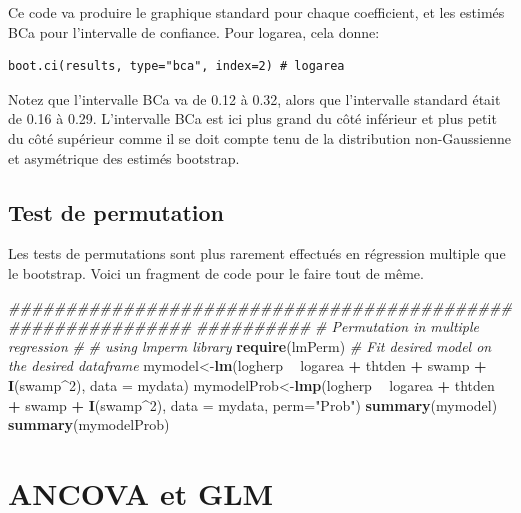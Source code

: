 \documentclass[12pt,]{book}
\newenvironment{Shaded}{\begin{snugshade}}{\end{snugshade}}
\newcommand{\CommentTok}[1]{\textcolor[rgb]{0.37,0.37,0.37}{\textit{#1}}}
\newcommand{\DataTypeTok}[1]{\textcolor[rgb]{0.27,0.27,0.27}{#1}}
\newcommand{\DecValTok}[1]{\textcolor[rgb]{0.06,0.06,0.06}{#1}}
\newcommand{\KeywordTok}[1]{\textcolor[rgb]{0.27,0.27,0.27}{\textbf{#1}}}
\newcommand{\NormalTok}[1]{#1}
\newcommand{\OperatorTok}[1]{\textcolor[rgb]{0.43,0.43,0.43}{\textbf{#1}}}
\newcommand{\StringTok}[1]{\textcolor[rgb]{0.5,0.5,0.5}{#1}}
\begin{document}
Ce code va produire le graphique standard pour chaque coefficient, et les estimés BCa pour l'intervalle de confiance. Pour logarea, cela donne:

\begin{verbatim}
boot.ci(results, type="bca", index=2) # logarea
\end{verbatim}

Notez que l'intervalle BCa va de 0.12 à 0.32, alors que l'intervalle standard était de 0.16 à 0.29. L'intervalle BCa est ici plus grand du côté inférieur et plus petit du côté supérieur comme il se doit compte tenu de la distribution non-Gaussienne et asymétrique des estimés bootstrap.

\hypertarget{perm_reg_mult}{%
\section{Test de permutation}\label{perm_reg_mult}}

Les tests de permutations sont plus rarement effectués en régression multiple que le bootstrap. Voici un fragment de code pour le faire tout de même.

\begin{Shaded}
\begin{Highlighting}[]
\CommentTok{############################################################}
\CommentTok{##########}
\CommentTok{# Permutation in multiple regression}
\CommentTok{#}
\CommentTok{# using lmperm library}
\KeywordTok{require}\NormalTok{(lmPerm)}
\CommentTok{# Fit desired model on the desired dataframe}
\NormalTok{mymodel<-}\KeywordTok{lm}\NormalTok{(logherp }\OperatorTok{~}\StringTok{ }\NormalTok{logarea }\OperatorTok{+}\StringTok{ }\NormalTok{thtden }\OperatorTok{+}\StringTok{ }\NormalTok{swamp }\OperatorTok{+}\StringTok{ }\KeywordTok{I}\NormalTok{(swamp}\OperatorTok{^}\DecValTok{2}\NormalTok{),}
\DataTypeTok{data =}\NormalTok{ mydata)}
\NormalTok{mymodelProb<-}\KeywordTok{lmp}\NormalTok{(logherp }\OperatorTok{~}\StringTok{ }\NormalTok{logarea }\OperatorTok{+}\StringTok{ }\NormalTok{thtden }\OperatorTok{+}\StringTok{ }\NormalTok{swamp }\OperatorTok{+}
\KeywordTok{I}\NormalTok{(swamp}\OperatorTok{^}\DecValTok{2}\NormalTok{), }\DataTypeTok{data =}\NormalTok{ mydata, }\DataTypeTok{perm=}\StringTok{"Prob"}\NormalTok{)}
\KeywordTok{summary}\NormalTok{(mymodel)}
\KeywordTok{summary}\NormalTok{(mymodelProb)}
\end{Highlighting}
\end{Shaded}

\hypertarget{ancova-et-glm}{%
\chapter{ANCOVA et GLM}\label{ancova-et-glm}}
\end{document}
